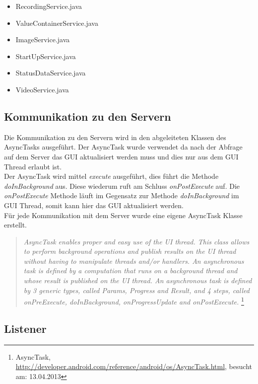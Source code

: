 \begin{itemize} [noitemsep,topsep=0pt]
	\item RecordingService.java
	\item ValueContainerService.java
	\item ImageService.java
	\item StartUpService.java
	\item StatusDataService.java
	\item VideoService.java
\end{itemize}

\subsection{Kommunikation zu den Servern}
Die Kommunikation zu den Servern wird in den abgeleiteten Klassen des AsyncTasks ausgeführt. Der AsyncTask wurde verwendet da nach der Abfrage auf dem Server das GUI aktualisiert werden muss und dies nur aus dem GUI Thread erlaubt ist. \\
Der AsyncTask wird mittel \textit{execute} ausgeführt, dies führt die Methode \textit{doInBackground} aus. Diese wiederum ruft am Schluss \textit{onPostExecute} auf. Die \textit{onPostExecute} Methode läuft im Gegensatz zur Methode \textit{doInBackground} im GUI Thread, somit kann hier das GUI aktualisiert werden.
\\Für jede Kommunikation mit dem Server wurde eine eigene AsyncTask Klasse erstellt.


\begin{quotation}
\textit{AsyncTask enables proper and easy use of the UI thread. This class allows to perform background operations and publish results on the UI thread without having to manipulate threads and/or handlers. An asynchronous task is defined by a computation that runs on a background thread and whose result is published on the UI thread. An asynchronous task is defined by 3 generic types, called Params, Progress and Result, and 4 steps, called onPreExecute, doInBackground, onProgressUpdate and onPostExecute.} \footnote{AsyncTask, \url{http://developer.android.com/reference/android/os/AsyncTask.html}, besucht am: 13.04.2013}
\end{quotation}

\subsection{Listener}

